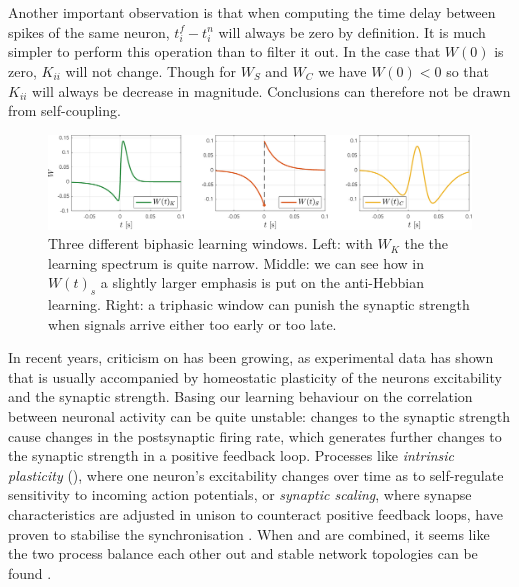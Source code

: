 Another important observation is that when computing the time delay between spikes of the same neuron, $t_{i}^{f}-t_i^{n}$ will always be zero by definition. It is much simpler to perform this operation than to filter it out. In the case that $W(0)$ is zero, $K_{ii}$ will not change. Though for $W_S$ and $W_C$ we have $W(0) < 0$ so that $K_{ii}$ will always be decrease in magnitude. Conclusions can therefore not be drawn from self-coupling.

\begin{figure}[H]
\centering
\includegraphics[width = \textwidth]{../Figures/Learning/LearningWindows.pdf}
\caption{Three different biphasic learning windows. Left: with $W_K$ the the learning spectrum is quite narrow. Middle: we can see how in $W(t)_s$ a slightly larger emphasis is put on the anti-Hebbian learning. Right: a triphasic window can punish the synaptic strength when signals arrive either too early or too late.}
\label{fig:LearningWindows}
\end{figure}

In recent years, criticism on \STDP has been growing, as experimental data has shown that \STDP is usually accompanied by homeostatic plasticity of the neurons excitability and the synaptic strength. Basing our learning behaviour on the correlation between neuronal activity can be quite unstable: changes to the synaptic strength cause changes in the postsynaptic firing rate, which generates further changes to the synaptic strength in a positive feedback loop. Processes like \textsl{intrinsic plasticity} (\IP), where one neuron's excitability changes over time as to self-regulate sensitivity to incoming action potentials, or \textsl{synaptic scaling}, where synapse characteristics are adjusted in unison to counteract positive feedback loops, have proven to stabilise the synchronisation \cite{ChrolCannon2014, Kirkwood2019}. When \STDP and \IP are combined, it seems like the two process balance each other out and stable network topologies can be found \cite{Song2017}.


